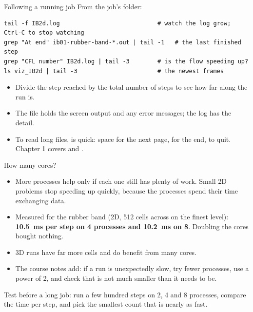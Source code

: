 \documentclass[aspectratio=169,11pt]{beamer}
\begin{document}
\begin{frame}[fragile]{Following a running job}
From the job's folder:
\begin{lstlisting}[style=shell]
tail -f IB2d.log                            # watch the log grow; Ctrl-C to stop watching
grep "At end" ib01-rubber-band-*.out | tail -1   # the last finished step
grep "CFL number" IB2d.log | tail -3        # is the flow speeding up?
ls viz_IB2d | tail -3                       # the newest frames
\end{lstlisting}
\begin{itemize}\small
  \item Divide the step reached by the total number of steps to see how far along the run is.
  \item The  file holds the screen output and any error messages; the log has the detail.
  \item To read long files,  is quick: space for the next page,  for the end,  to quit. Chapter 1 covers  and .
\end{itemize}
\end{frame}

\begin{frame}{How many cores?}
\begin{itemize}
  \item More processes help only if each one still has plenty of work. Small 2D problems stop speeding up quickly, because the processes spend their time exchanging data.
  \item Measured for the rubber band (2D, 512 cells across on the finest level): \textbf{10.5~ms per step on 4 processes and 10.2~ms on 8}. Doubling the cores bought nothing.
  \item 3D runs have far more cells and do benefit from many cores.
  \item The course notes add: if a run is unexpectedly slow, try fewer processes, use a power of 2, and check that  is not much smaller than it needs to be.
\end{itemize}
\vspace{3mm}
\begin{punchbox}
\small Test before a long job: run a few hundred steps on 2, 4 and 8 processes, compare the time per step, and pick the smallest count that is nearly as fast.
\end{punchbox}
\end{frame}
\end{document}
